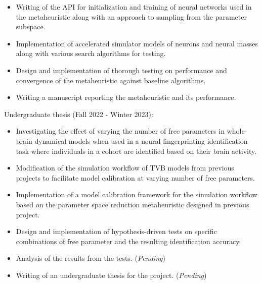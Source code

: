 \documentclass[margin, 10pt]{res} %
\begin{document}
\begin{resume}
\begin{itemize}
			\item Writing of the API for initialization and training of neural networks used in the metaheuristic along with an approach to sampling from the parameter subspace.
			\item Implementation of accelerated simulator models of neurons and neural masses along with various search algorithms for testing. 
			\item Design and implementation of thorough testing on performance and convergence of the metaheuristic against baseline algorithms.
			\item Writing a manuscript reporting the metaheuristic and its performance.
		\end{itemize}
		\vspace{-0.10cm}
		Undergraduate thesis (Fall 2022 - Winter 2023):
		\vspace*{0.15cm}
		\begin{itemize} \itemsep -2pt %
			\item[\ding{227}] Investigating the effect of varying the number of free parameters in whole-brain dynamical models when used in a neural fingerprinting identification task where individuals in a cohort are identified based on their brain activity.
			\item Modification of the simulation workflow of TVB models from previous projects to facilitate model calibration at varying number of free parameters.
			\item Implementation of a model calibration framework for the simulation workflow based on the parameter space reduction metaheuristic designed in previous project.
			\item Design and implementation of hypothesis-driven tests on specific combinations of free parameter and the resulting identification accuracy.
			\item Analysis of the results from the tests. (\textit{Pending}) 
			\item Writing of an undergraduate thesis for the project. (\textit{Pending}) 
		\end{itemize}
		
		

\end{resume}
\end{document}
